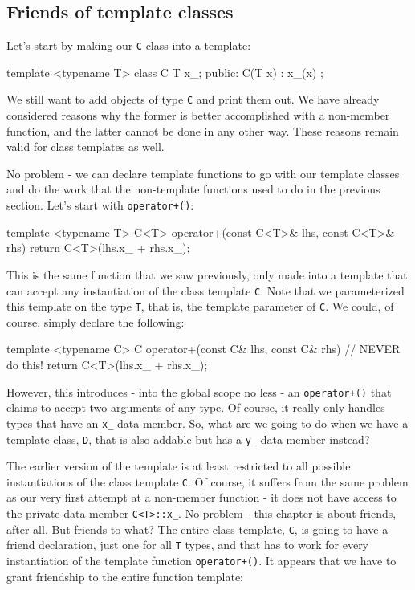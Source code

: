 \subsection{Friends of template classes}

Let's start by making our \texttt{C} class into a template:

\begin{code}
template <typename T> class C {
  T x_;
  public:
  C(T x) : x_(x) {}
};
\end{code}

We still want to add objects of type \texttt{C} and print them out. We have already considered reasons why the former is better accomplished with a non-member function, and the latter cannot be done in any other way. These reasons remain valid for class templates as well.

No problem - we can declare template functions to go with our template classes and do the work that the non-template functions used to do in the previous section. Let's start with \texttt{operator+()}:

\begin{code}
template <typename T>
C<T> operator+(const C<T>& lhs, const C<T>& rhs) {
  return C<T>(lhs.x_ + rhs.x_);
}
\end{code}

This is the same function that we saw previously, only made into a template that can accept any instantiation of the class template \texttt{C}. Note that we parameterized this template on the type \texttt{T}, that is, the template parameter of \texttt{C}. We could, of course, simply declare the following:

\begin{code}
template <typename C>
C operator+(const C& lhs, const C& rhs) { // NEVER do this!
  return C<T>(lhs.x_ + rhs.x_);
}
\end{code}

However, this introduces - into the global scope no less - an \texttt{operator+()} that claims to accept two arguments of any type. Of course, it really only handles types that have an \texttt{x\_} data member. So, what are we going to do when we have a template class, \texttt{D}, that is also addable but has a \texttt{y\_} data member instead?

The earlier version of the template is at least restricted to all possible instantiations of the class template \texttt{C}. Of course, it suffers from the same problem as our very first attempt at a non-member function - it does not have access to the private data member \texttt{C\textless{}T\textgreater{}::x\_}. No problem - this chapter is about friends, after all. But friends to what? The entire class template, \texttt{C}, is going to have a friend declaration, just one for all \texttt{T} types, and that has to work for every instantiation of the template function \texttt{operator+()}. It appears that we have to grant friendship to the entire function template:

